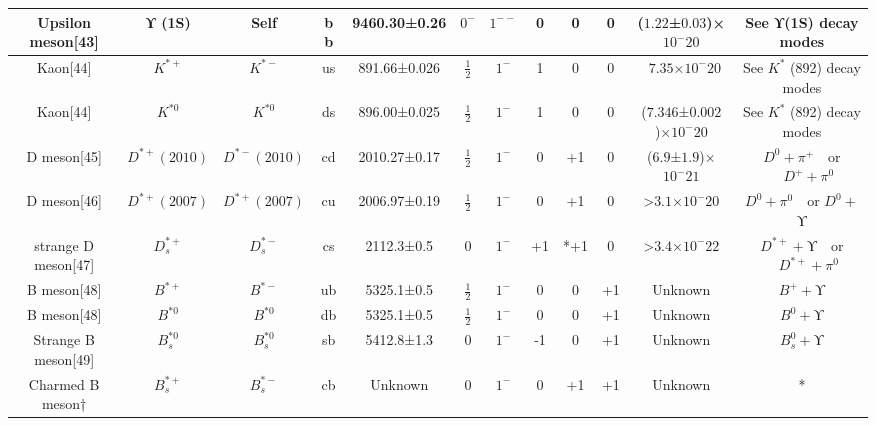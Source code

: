 \begin{table}[ht]
\begin{tabular}{|c|c|c|c|c|c|c|c|c|c|c|c|}
Upsilon meson[43] &ϒ (1S)	 & Self & b b &   9460.30±0.26& $0^-$ & $1^{--}$ &0 & 0 &0& ($1.22$±$0.03$)×$10^-20$ &See ϒ(1S) decay modes\\
\hline
Kaon[44] & $K^{*+}$ & $K^{*-}$  & us &   891.66±0.026 & $\frac{1}{2}$ & $1^-$ & 1 & 0 & 0 & ~$7.35$×$10^-20$ &See $K^*$ (892) decay modes\\
\hline
Kaon[44] & $K^{*0}$ & $K^{*0}$ & ds &  896.00±0.025 & $\frac{1}{2}$ & $1^-$  & 1 & 0 & 0 & ($7.346$±$0.002$)×$10^-20$ & See $K^*$ (892) decay modes\\
\hline
D meson[45] & $D^{*+}(2010)$ & $D^{*-}(2010)$ &cd &	2010.27±0.17   & $\frac{1}{2}$ & $1^-$& 0 & +1 & 0 & ($6.9$±$1.9$)×$10^-21$ & $D^0+\pi^+ \quad$or $\quad D^+ +\pi^0$ \\
\hline
D meson[46] & $D^{*+}(2007)$ & $D^{*+}(2007)$ & cu & 2006.97±0.19& $\frac{1}{2}$ &  $1^-$ & 0 & +1 & 0& >$3.1$×$10^-20$ & $D^0+\pi^0 \quad$or $D^0+$ϒ \\
\hline
strange D meson[47]	 & $D^{*+}_s$ & $D^{*-}_s$ & cs & 2112.3±0.5 & 0& $1^-$ & +1 & *+1& 0 & >$3.4$×$10^-22$& $D^{*+}+\text{ϒ} \quad$or $\quad D^{*+}+\pi^0$ \\
\hline
B meson[48] &$B^{*+}$ & $B^{*-}$ &ub &5325.1±0.5 & $\frac{1}{2}$ & $1^-$& 0 & 0 & +1 & Unknown &$B^+ +$ϒ \\
\hline
B meson[48] &$B^{*0}$ & $B^{*0}$ & db &5325.1±0.5 & $ \frac{1}{2}$&$1^-$ & 0 & 0 & +1 & Unknown & $B^0 +$ϒ\\
\hline
Strange B meson[49] & $B^{*0}_s$ & $B^{*0}_s$ & sb&5412.8±1.3 &0 & $1^-$ & -1 & 0 & +1 & Unknown& $B^0_s+$ϒ \\
\hline
Charmed B meson† & $B^{*+}_s$  & $B^{*-}_s$ & cb & Unknown& 0 & $1^-$ & 0 & +1 & +1 & Unknown & * \\
\hline
\end{tabular}
\end{table}